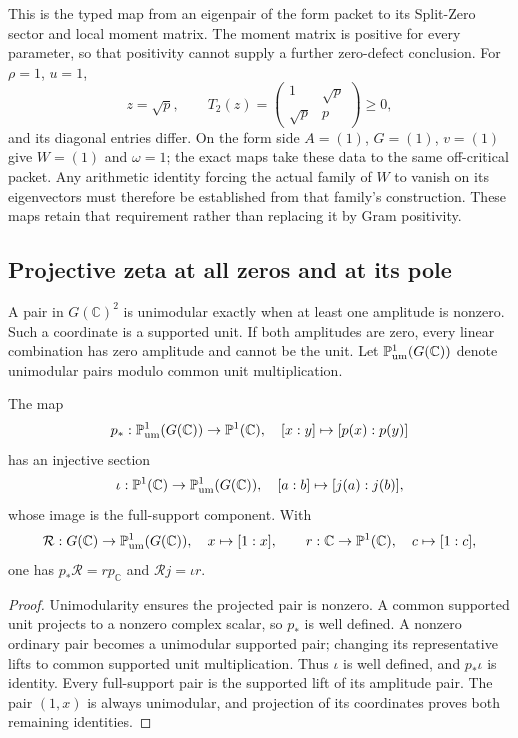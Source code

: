 This is the typed map from an eigenpair of the form packet to its Split-Zero sector and local moment matrix. The moment matrix is positive for every parameter, so that positivity cannot supply a further zero-defect conclusion. For $\rho=1$, $u=1$,
\[
z=\sqrt p,\qquad T_2(z)=\begin{pmatrix}1&\sqrt p\\\sqrt p&p\end{pmatrix}\ge0,
\]
and its diagonal entries differ. On the form side $A=(1)$, $G=(1)$, $v=(1)$ give $W=(1)$ and $\omega=1$; the exact maps take these data to the same off-critical packet. Any arithmetic identity forcing the actual family of $W$ to vanish on its eigenvectors must therefore be established from that family's construction. These maps retain that requirement rather than replacing it by Gram positivity.

\subsection{Projective zeta at all zeros and at its pole}

A pair in $G(\mathbb C)^2$ is unimodular exactly when at least one amplitude is nonzero. Such a coordinate is a supported unit. If both amplitudes are zero, every linear combination has zero amplitude and cannot be the unit. Let $\mathbb P_{\rm um}^1(G(\mathbb C))$ denote unimodular pairs modulo common unit multiplication.

\begin{proposition}
\label{prop:sz-projective-section}
The map
\[
p_*:\mathbb P_{\rm um}^1(G(\mathbb C))\to\mathbb P^1(\mathbb C),
\quad[x:y]\mapsto[p(x):p(y)]
\]
has an injective section
\[
\iota:\mathbb P^1(\mathbb C)\to\mathbb P_{\rm um}^1(G(\mathbb C)),
\quad[a:b]\mapsto[j(a):j(b)],
\]
whose image is the full-support component. With
\[
\mathcal R:G(\mathbb C)\to\mathbb P_{\rm um}^1(G(\mathbb C)),
\quad x\mapsto[1:x],\qquad
r:\mathbb C\to\mathbb P^1(\mathbb C),\quad c\mapsto[1:c],
\]
one has $p_*\mathcal R=r p_{\mathbb C}$ and $\mathcal Rj=\iota r$.
\end{proposition}
\begin{proof}
Unimodularity ensures the projected pair is nonzero. A common supported unit projects to a nonzero complex scalar, so $p_*$ is well defined. A nonzero ordinary pair becomes a unimodular supported pair; changing its representative lifts to common supported unit multiplication. Thus $\iota$ is well defined, and $p_*\iota$ is identity. Every full-support pair is the supported lift of its amplitude pair. The pair $(1,x)$ is always unimodular, and projection of its coordinates proves both remaining identities.
\end{proof}

